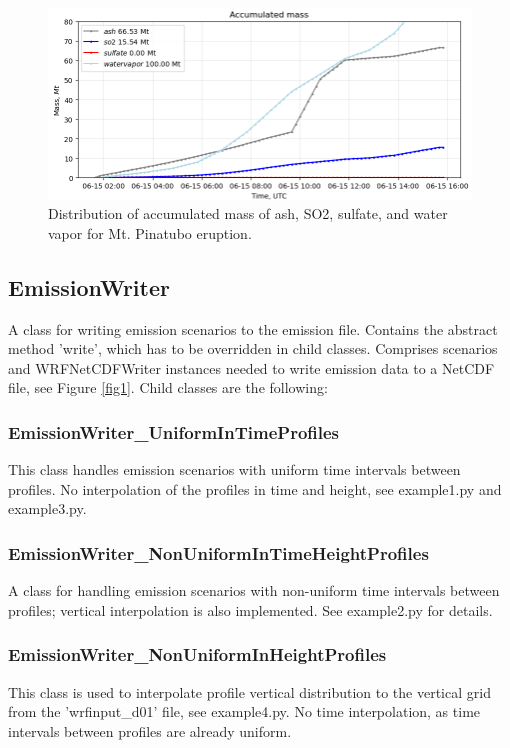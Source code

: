 \documentclass{article}
\begin{document}
\begin{figure}
    \centering
    \includegraphics[width=1\linewidth]{fig5_accumulated.png}
    \caption{Distribution of accumulated mass of ash, SO2, sulfate, and water vapor for Mt. Pinatubo eruption.}
    \label{fig5}
\end{figure}


\subsection{EmissionWriter}
A class for writing emission scenarios to the emission file. Contains the abstract method 'write', which has to be overridden in child classes. Comprises scenarios and WRFNetCDFWriter instances needed to write emission data to a NetCDF file, see Figure \ref{fig1}. Child classes are the following:

\subsubsection{EmissionWriter\_UniformInTimeProfiles}
This class handles emission scenarios with uniform time intervals between profiles. No interpolation of the profiles in time and height, see example1.py and example3.py.


\subsubsection{EmissionWriter\_NonUniformInTimeHeightProfiles}
A class for handling emission scenarios with non-uniform time intervals between profiles; vertical interpolation is also implemented. See example2.py for details.

\subsubsection{EmissionWriter\_NonUniformInHeightProfiles}
This class is used to interpolate profile vertical distribution to the vertical grid from the 'wrfinput\_d01' file, see example4.py. No time interpolation, as time intervals between profiles are already uniform.
\end{document}
